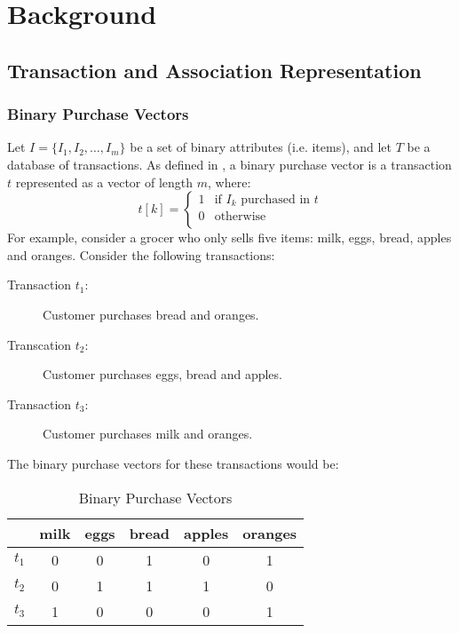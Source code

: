 \chapter{Background}

\section{Transaction and Association Representation}
\subsection{Binary Purchase Vectors}
\label{sec:binary_purchase_vectors}
Let $I = \{I_1, I_2,\dots,I_m\}$ be a set of binary attributes (i.e. items), and let $T$ be a database of transactions.
As defined in , a binary purchase vector is a transaction $t$ represented as a vector of length $m$, where:
\[
t[k] = 
\begin{cases}
1 & \text{if } I_k \text{ purchased in } t\\
0 & \text{otherwise}\\
\end{cases}
\]
For example, consider a grocer who only sells five items: milk, eggs, bread, apples and oranges.
Consider the following transactions:
\begin{description}
\item[Transaction $t_1$:] Customer purchases bread and oranges.
\item[Transcation $t_2$:] Customer purchases eggs, bread and apples.
\item[Transaction $t_3$:] Customer purchases milk and oranges.
\end{description}
The binary purchase vectors for these transactions would be:
\begin{table}[H]
\centering
\begin{tabular}{@{}cccccc@{}}

\toprule
 & milk & eggs & bread & apples & oranges \\ \midrule
$t_1$ &  0    & 0    & 1     & 0      & 1       \\ \bottomrule
$t_2$ &  0    & 1    & 1     & 1      & 0       \\ \bottomrule
$t_3$ &  1    & 0    & 0     & 0      & 1       \\ \bottomrule
\end{tabular}
\caption{Binary Purchase Vectors}
\label{tab:binary_vectors}
\end{table}
